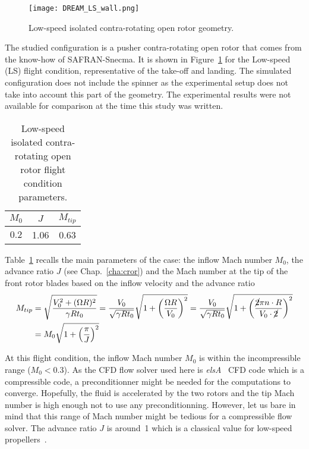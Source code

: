 

\begin{figure}[htp]
  \centering
  \texttt{[image: DREAM\_LS\_wall.png]}
  \caption{Low-speed isolated contra-rotating open rotor geometry.}
  \label{fig:dream_ls_wall}
\end{figure}

The studied configuration is a pusher contra-rotating open rotor
that comes from the know-how of SAFRAN-Snecma. 
It is shown in Figure~\ref{fig:dream_ls_wall} for the
Low-speed (LS) flight condition, representative of the take-off
and landing.
The simulated configuration does not include the spinner as the
experimental setup does not take into account this part of the geometry.
The experimental results were not available for comparison
at the time this study was written.

\begin{table}[htp]
   \centering
  \begin{tabular}{ccc}
    \toprule
    $M_0$ & $J$ & $M_{tip}$ \\
    \midrule
    $0.2$ & 1.06 & 0.63 \\
    \bottomrule
  \end{tabular}
  \caption{Low-speed isolated contra-rotating open rotor flight condition parameters.}
  \label{tab:dream_ls_flight_condition}
\end{table} 
Table~\ref{tab:dream_ls_flight_condition} recalls the main
parameters of the case: the inflow Mach number $M_0$,
the advance ratio $J$ (see Chap.~\ref{cha:cror})
and the Mach number at the tip of
the front rotor blades based on the inflow 
velocity and the advance ratio
\begin{equation}
  \begin{split}
    M_{tip} &= 
        \sqrt{\frac{V_0^2 + (\Omega R)^2}{\gamma R t_0}} =
        \frac{V_0}{\sqrt{\gamma R t_0}} 
          \sqrt{1 + \left(\frac{\Omega R}{V_0}\right)^2} =
        \frac{V_0}{\sqrt{\gamma R t_0}} 
          \sqrt{1 + \left(\frac{\cancel{2} \pi n \cdot R}{
          V_0 \cdot \cancel{2}}\right)^2} \\
    &= M_0 \sqrt{1 + \left(\frac{\pi}{J} \right)^2}
  \end{split}
  \label{eq:m_tip}
\end{equation}

At this flight condition, the inflow Mach 
number $M_0$ is within the incompressible range
($M_0 < 0.3$). As the CFD flow solver used here is 
\textit{elsA}~\cite{Cambier2013} CFD code which is a compressible code, 
a preconditionner might be needed for the computations to converge. 
Hopefully, the fluid is accelerated by the two rotors
and the tip Mach number is high enough not to use any preconditionning.
However, let us bare in mind that this range of Mach number might
be tedious for a compressible flow solver.
The advance ratio $J$ is around~1 which is a classical value for
low-speed propellers~\cite{Bousquet2012}. 

